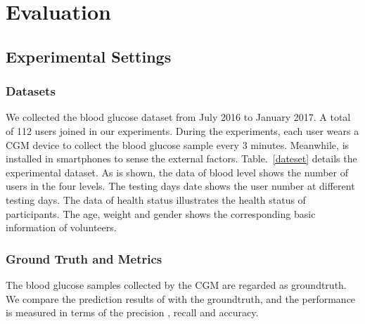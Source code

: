 
\section{Evaluation}
\label{sec:eval}
\subsection{Experimental Settings}
\subsubsection{Datasets}

We collected the blood glucose dataset from July 2016 to January 2017. A total of 112 users joined in our experiments. During the experiments, each user wears a CGM device to collect the blood glucose sample every 3 minutes. Meanwhile, \sysname is installed in smartphones to sense the external factors.  Table.~\ref{dateset} details the experimental dataset. As is shown, the data of blood level shows the number of users in the four levels. The testing days date shows the user number at different testing days. The data of health status illustrates the health status of participants. The age, weight and gender shows the corresponding basic information of volunteers.

\subsubsection{Ground Truth and Metrics}

The blood glucose samples collected by the CGM are regarded as groundtruth. We compare the prediction results of \sysname with the groundtruth, and the performance is measured in terms of the precision \cite{}, recall\cite{} and accuracy\cite{}.

